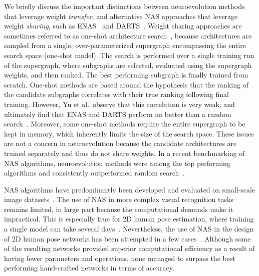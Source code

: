 \documentclass{ieeeaccess}
\begin{document}
We briefly discuss the important distinctions between neuroevolution methods that leverage weight \textit{transfer}, and alternative NAS approaches that leverage weight \textit{sharing}, such as ENAS~\cite{pham2018efficient} and DARTS~\cite{liu2018darts}. Weight sharing approaches are sometimes referred to as one-shot architecture search~\cite{bender2018understanding}, because architectures are sampled from a single, over-parameterized supergraph encompassing the entire search space (one-shot model). The search is performed over a single training run of the supergraph, where subgraphs are selected, evaluated using the supergraph weights, and then ranked. The best performing subgraph is finally trained from scratch. One-shot methods are based around the hypothesis that the ranking of the candidate subgraphs correlates with their true ranking following final training. However, Yu et al.\ observe that this correlation is very weak, and ultimately find that ENAS and DARTS perform no better than a random search~\cite{yu2019evaluating}. Moreover, some one-shot methods require the entire supergraph to be kept in memory, which inherently limits the size of the search space. These issues are not a concern in neuroevolution because the candidate architectures are trained separately and thus do not share weights. In a recent benchmarking of NAS algorithms, neuroevolution methods were among the top performing algorithms and consistently outperformed random search~\cite{ying2019bench}.

NAS algorithms have predominantly been developed and evaluated on small-scale image datasets~\cite{wistuba2019survey}. The use of NAS in more complex visual recognition tasks remains limited, in large part because the computational demands make it impractical. This is especially true for 2D human pose estimation, where training a single model can take several days~\cite{chen2018cascaded}. Nevertheless, the use of NAS in the design of 2D human pose networks has been attempted in a few cases~\cite{yang2019pose, gong2020autopose, zhang2020cpnas}. Although some of the resulting networks provided superior computational efficiency as a result of having fewer parameters and operations, none managed to surpass the best performing hand-crafted networks in terms of accuracy. 
\end{document}
